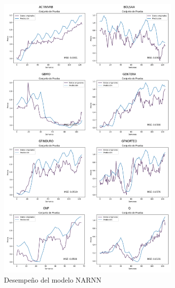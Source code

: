 \begin{figure}[H]
    \centering
    \includegraphics[width=0.8\textwidth]{Figuras/analisis/NARNN.png}
    \caption{Desempeño del modelo NARNN} 
    \label{fig:desempenio_NARNN}
\end{figure}

